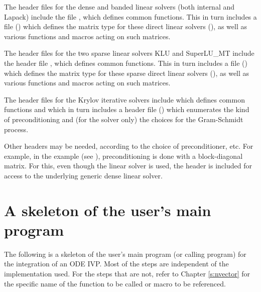 The header files for the dense and banded linear solvers (both
internal and Lapack) include the file , which
defines common functions.  This in turn includes a file
() which defines the matrix type for these
direct linear solvers (), as well as various functions and
macros acting on such matrices.

The header files for the two sparse linear solvers KLU and SuperLU\_MT 
include the header file , which defines common functions.
This in turn includes a file () which defines
the matrix type for these sparse direct linear solvers (),
as well as various functions and macros acting on such matrices.

The header files for the Krylov iterative solvers include 
which defines common functions and which in turn includes a header file ()
which enumerates the kind of preconditioning and (for the {\spgmr} solver only) 
the choices for the Gram-Schmidt process.

Other headers may be needed, according to the choice of
preconditioner, etc.  For example, in the 
example (see \cite{cvodes_ex}), preconditioning is done with a
block-diagonal matrix. For this, even though the {\cvspgmr} linear
solver is used, the header  is included for
access to the underlying generic dense linear solver.

\section{A skeleton of the user's main program}\label{ss:skeleton_sim}

The following is a skeleton of the user's main program (or calling
program) for the integration of an ODE IVP. Most of the steps are
independent of the {\nvector} implementation used.  For the steps that
are not, refer to Chapter \ref{s:nvector} for the specific name of the
function to be called or macro to be referenced.

